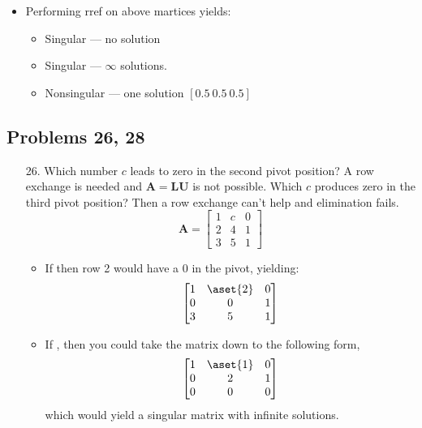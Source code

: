 \begin{itemize}
\begin{itemize}
      \begin{itemize}\color{foreground}
        \item Performing rref on above martices yields:
          \begin{itemize}
            \item Singular --- no solution

            \item Singular --- \(\infty\) solutions.

            \item Nonsingular --- one solution \([0.5~0.5~0.5]\)
          \end{itemize}
      \end{itemize}

    \end{itemize}

    \newpage
    \subsection{Problems 26, 28}
    \begin{enumerate}\color{foreground-2}
      \item[26.] Which number \(c\) leads to zero in the second pivot position? A row
        exchange is needed and \(\bm{A} = \bm{LU}\) is not possible. Which
        \(c\) produces zero in the third pivot position? Then a  row exchange
        can't help and elimination fails.
        \[%
        \bm{A} =
        \begin{bmatrix}
        1 & c & 0 \\
        2 & 4 & 1 \\
        3 & 5 & 1
        \end{bmatrix}
        \]%
        \begin{itemize}\color{foreground}
          \item If  then row 2 would have a 0 in the pivot, yielding:
            \[%
              \begin{bmatrix}
                1 & \aset{2} & 0 \\
                0 & 0 & 1 \\
                3 & 5 & 1
              \end{bmatrix}
            \]%

          \item If , then you could take the matrix down to the
            following form,
            \[%
              \begin{bmatrix}
                1 & \aset{1} & 0 \\
                0 & 2 & 1 \\
                0 & 0 & 0
              \end{bmatrix}
            \]%
            which would yield a singular matrix with infinite solutions.
        \end{itemize}


\end{enumerate}
\end{itemize}
